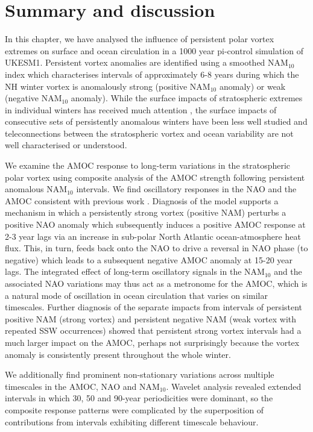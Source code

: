 \section{Summary and discussion}
In this chapter, we have analysed the influence of persistent polar vortex extremes on surface and ocean circulation in a 1000 year pi-control simulation of UKESM1. Persistent vortex anomalies are identified using a smoothed NAM$_{10}$ index which characterises intervals of approximately 6-8 years during which the NH winter vortex is anomalously strong (positive NAM$_{10}$ anomaly) or weak (negative NAM$_{10}$ anomaly). While the surface impacts of stratospheric extremes in individual winters has received much attention \citep{baldwinStratospheric2001a, domeisenEstimating2019d, charlton-perezInfluence2018e}, the surface impacts of consecutive sets of persistently anomalous winters have been less well studied and teleconnections between the stratospheric vortex and ocean variability are not well characterised or understood. 

We examine the AMOC response to long-term variations in the stratospheric polar vortex using composite analysis of the AMOC strength following persistent anomalous NAM$_{10}$ intervals. We find oscillatory responses in the NAO and the AMOC consistent with previous work \citep{reichlerStratospheric2012b}. Diagnosis of the model supports a mechanism in which a persistently strong vortex (positive NAM) perturbs a positive NAO anomaly which subsequently induces a positive AMOC response at 2-3 year lags via an increase in sub-polar North Atlantic ocean-atmosphere heat flux. This, in turn, feeds back onto the NAO to drive a reversal in  NAO phase (to negative) which leads to a subsequent negative AMOC anomaly at 15-20 year lags. The integrated effect of long-term oscillatory signals in the NAM$_{10}$ and the associated NAO variations may thus act as a metronome for the AMOC, which is a natural mode of oscillation in  ocean circulation that varies on similar timescales. Further diagnosis of the separate impacts from  intervals of persistent positive NAM (strong vortex) and persistent negative NAM (weak vortex with repeated SSW occurrences) showed that persistent strong vortex intervals had a much larger impact on the AMOC, perhaps not surprisingly because the vortex anomaly is consistently present throughout the whole winter.

We additionally find prominent non-stationary variations across multiple timescales in the AMOC, NAO and NAM$_{10}$. Wavelet analysis revealed extended intervals in  which 30, 50 and 90-year periodicities were dominant, so the composite response patterns were complicated by  the superposition of contributions from intervals exhibiting different timescale behaviour. 


